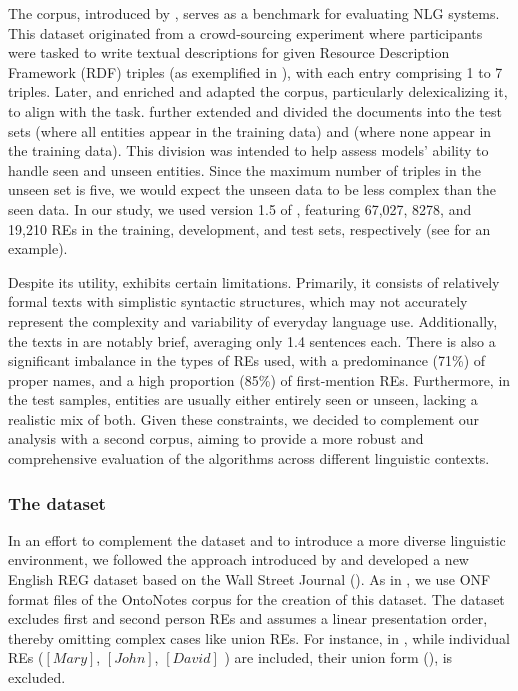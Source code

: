 The \webnlg corpus, introduced by \citet{gardent-etal-2017-creating}, serves as a benchmark for evaluating NLG systems. This dataset originated from a crowd-sourcing experiment where participants were tasked to write textual descriptions for given Resource Description Framework (RDF) triples (as exemplified in ), with each entry comprising 1 to 7 triples. Later, \citet{ferreira2018neuralreg} and \citet{castro-ferreira-etal-2018-enriching} enriched and adapted the corpus, particularly delexicalizing it, to align with the \context task. \citet{castro-ferreira-etal-2019-neural} further extended \webnlg and divided the documents into the test sets  (where all entities appear in the training data) and  (where none appear in the training data). This division was intended to help assess models' ability to handle seen and unseen entities. Since the maximum number of triples in the unseen set is five, we would expect the unseen data to be less complex than the seen data. In our study, we used version 1.5 of \webnlg, featuring 67,027, 8278, and 19,210 REs in the training, development, and test sets, respectively (see  for an example).

Despite its utility, \webnlg exhibits certain limitations. Primarily, it consists of relatively formal texts with simplistic syntactic structures, which may not accurately represent the complexity and variability of everyday language use. Additionally, the texts in \webnlg are notably brief, averaging only 1.4 sentences each. There is also a significant imbalance in the types of REs used, with a predominance (71\%) of proper names, and a high proportion (85\%) of first-mention REs. Furthermore, in the test samples, entities are usually either entirely seen or unseen, lacking a realistic mix of both. Given these constraints, we decided to complement our analysis with a second corpus, aiming to provide a more robust and comprehensive evaluation of the algorithms across different linguistic contexts.


\subsubsection{The \wsj dataset}\label{subsec:wsjdataset}

In an effort to complement the \webnlg dataset and to introduce a more diverse linguistic environment, we followed the approach introduced by \citet{ferreira2018neuralreg} and developed a new English REG dataset based on the Wall Street Journal (\wsj). As in , we use ONF format files of the OntoNotes corpus \citep{weischedel2013ontonotes} for the creation of this dataset. The dataset excludes first and second person REs and assumes a linear presentation order, thereby omitting complex cases like union REs. For instance, in , while individual REs ($[Mary]$, $[John]$, $[David]$ ) are included, their union form (), is excluded.

